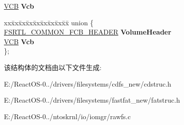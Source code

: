 \begin{DoxyCompactItemize}
\hyperlink{struct_d_e_v_i_c_e___e_x_t_e_n_s_i_o_n}{V\+CB} {\bfseries Vcb}
\item 
\mbox{\label{struct___v_o_l_u_m_e___d_e_v_i_c_e___o_b_j_e_c_t_a2c854369a5da53a5f1d0ee825905fcd6}} 
\begin{tabbing}
xx\=xx\=xx\=xx\=xx\=xx\=xx\=xx\=xx\=\kill
union \{\\
\>\hyperlink{struct___f_s_r_t_l___c_o_m_m_o_n___f_c_b___h_e_a_d_e_r}{FSRTL\_COMMON\_FCB\_HEADER} {\bfseries VolumeHeader}\\
\>\hyperlink{struct_d_e_v_i_c_e___e_x_t_e_n_s_i_o_n}{VCB} {\bfseries Vcb}\\
\}; \\

\end{tabbing}\end{DoxyCompactItemize}


该结构体的文档由以下文件生成\+:\begin{DoxyCompactItemize}
\item 
E\+:/\+React\+O\+S-\/0../drivers/filesystems/cdfs\+\_\+new/cdstruc.\+h\item 
E\+:/\+React\+O\+S-\/0../drivers/filesystems/fastfat\+\_\+new/fatstruc.\+h\item 
E\+:/\+React\+O\+S-\/0../ntoskrnl/io/iomgr/rawfs.\+c\end{DoxyCompactItemize}
